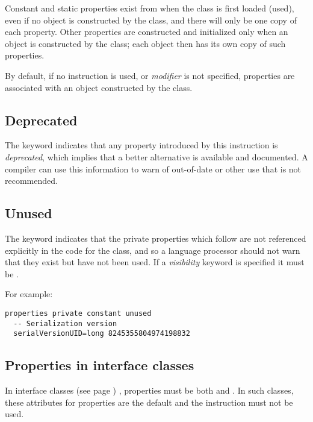 Constant and static properties exist from when the class is first loaded
(used), even if no object is constructed by the class, and there will
only be one copy of each property.  Other properties are constructed and
initialized only when an object is constructed by the class; each object
then has its own copy of such properties.
 
By default, if no  instruction is used, or
\emph{modifier} is not specified, properties are associated with an
object constructed by the class.
\subsection{Deprecated}\label{refdeppro}
 
The keyword  indicates that any property introduced by
this instruction is \emph{deprecated}, which implies that a
better alternative is available and documented.  A compiler can
use this information to warn of out-of-date or other use that is
not recommended.
\subsection{Unused}\label{refunupro}
 
The keyword  indicates that the private properties
which follow are not referenced explicitly in the code for the class,
and so a language processor should not warn that they exist but have not
been used.
If a \emph{visibility} keyword is specified it must be
.
 
For example:
\begin{lstlisting}
properties private constant unused
  -- Serialization version
  serialVersionUID=long 8245355804974198832
\end{lstlisting}
\subsection{Properties in interface classes}
 
In  interface classes (see page \pageref{refinterf}) , properties must be both
 and .  In such classes, these
attributes for properties are the default and the 
instruction must not be used.
